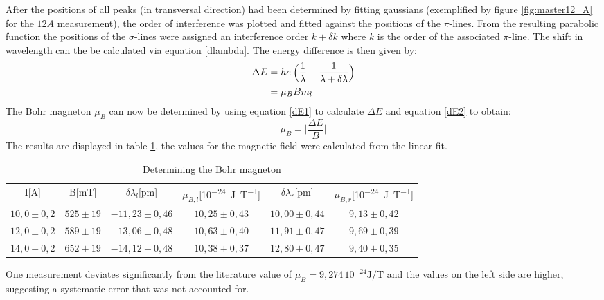 \documentclass[12pt]{article}
\begin{document}
	After the positions of all peaks (in transversal direction) had been determined by fitting gaussians (exemplified by figure \ref{fig:master12_A} for the $12A$ measurement), the order of interference was plotted and fitted against the positions of the $\pi$-lines. From the resulting parabolic function the positions of the $\sigma$-lines were assigned an interference order $k+\delta k$ where $k$ is the order of the associated $\pi$-line. The shift in wavelength can the be calculated via equation \ref{dlambda}. The energy difference is then given by:
	\begin{align}
		\Delta E&=hc\;\Bigl(\frac{1}{\lambda}-\frac{1}{\lambda+\delta \lambda} \Bigr) 
		\label{dE1}\\
		&=\mu_BBm_l
		\label{dE2}
	\end{align}
	The Bohr magneton $\mu_B$ can now be determined by using equation \ref{dE1} to calculate $\Delta E$ and equation \ref{dE2} to obtain:
	\begin{equation}	
		\mu_B=\biggl| \frac{\Delta E}{B}\biggr|
	\end{equation}
	The results are displayed in table \ref{resultsP1}, the values for the magnetic field were calculated from the linear fit.
	\begin{table}[H]
		\centering
		\begin{tabular}{cccccc}
			I[\si{\ampere}]&B[\si{\milli\tesla}]&$\delta\lambda_l$[\si{\pico\metre}]&$\mu_{B,l}$[\si{10^{-24}\joule\per\tesla}]&$\delta\lambda_r$[\si{\pico\metre}]&$\mu_{B,r}$[\si{10^{-24}\joule\per\tesla}]\\
			$10,0\pm 0,2$&$525\pm 19$&$-11,23\pm 0,46$&$10,25\pm 0,43$&$10,00\pm 0,44$&$9,13\pm 0,42$\\
			$12,0\pm 0,2$&$589\pm 19$&$-13,06\pm 0,48$&$10,63\pm 0,40$&$11,91\pm 0,47$&$9,69\pm 0,39$\\
			$14,0\pm 0,2$&$652\pm 19$&$-14,12\pm 0,48$&$10,38\pm 0,37$&$12,80\pm 0,47$&$9,40\pm 0,35$\\
		\end{tabular}
		\caption{Determining the Bohr magneton}
		\label{resultsP1}
	\end{table}
One measurement deviates significantly from the literature value of $\mu_B=9,274\, 10^{-24}\si{\joule\per\tesla}$ and the values on the left side are higher, suggesting a systematic error that was not accounted for.
\end{document}

